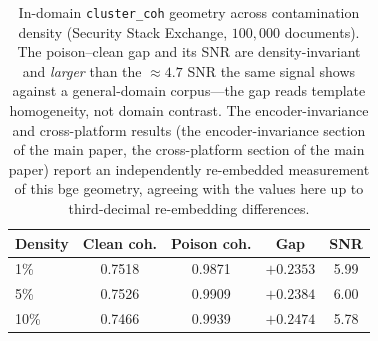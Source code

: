 \documentclass[lettersize,journal]{IEEEtran}
\begin{document}
\begin{table}[H]
\centering
\caption{In-domain \texttt{cluster\_coh} geometry across contamination density
(Security Stack Exchange, $100{,}000$ documents). The poison--clean gap and its
SNR are density-invariant and \emph{larger} than the $\approx\!4.7$ SNR the same
signal shows against a general-domain corpus---the gap reads template homogeneity,
not domain contrast. The encoder-invariance and cross-platform results
(the encoder-invariance section of the main paper, the cross-platform section of the main paper) report an independently re-embedded measurement of
this bge geometry, agreeing with the values here up to third-decimal re-embedding differences.}
\label{tab:coh}
\begin{tabular}{lcccc}
\toprule
Density & Clean coh. & Poison coh. & Gap & SNR \\
\midrule
1\%  & 0.7518 & 0.9871 & $+0.2353$ & 5.99 \\
5\%  & 0.7526 & 0.9909 & $+0.2384$ & 6.00 \\
10\% & 0.7466 & 0.9939 & $+0.2474$ & 5.78 \\
\bottomrule
\end{tabular}
\end{table}
\end{document}
